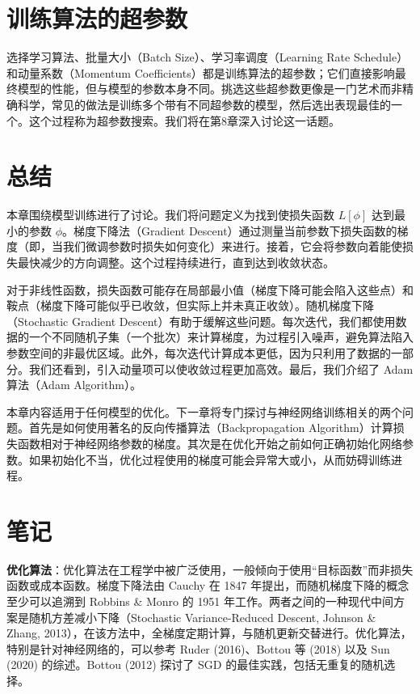 \documentclass[lang=cn,newtx,10pt,scheme=chinese]{elegantbook}
\begin{document}
\section{训练算法的超参数}
选择学习算法、批量大小（Batch Size）、学习率调度（Learning Rate Schedule）和动量系数（Momentum Coefficients）都是训练算法的超参数；它们直接影响最终模型的性能，但与模型的参数本身不同。挑选这些超参数更像是一门艺术而非精确科学，常见的做法是训练多个带有不同超参数的模型，然后选出表现最佳的一个。这个过程称为超参数搜索。我们将在第8章深入讨论这一话题。

\section{总结}
本章围绕模型训练进行了讨论。我们将问题定义为找到使损失函数 \(L[\phi]\) 达到最小的参数 \(\phi\)。梯度下降法（Gradient Descent）通过测量当前参数下损失函数的梯度（即，当我们微调参数时损失如何变化）来进行。接着，它会将参数向着能使损失最快减少的方向调整。这个过程持续进行，直到达到收敛状态。

对于非线性函数，损失函数可能存在局部最小值（梯度下降可能会陷入这些点）和鞍点（梯度下降可能似乎已收敛，但实际上并未真正收敛）。随机梯度下降（Stochastic Gradient Descent）有助于缓解这些问题。每次迭代，我们都使用数据的一个不同随机子集（一个批次）来计算梯度，为过程引入噪声，避免算法陷入参数空间的非最优区域。此外，每次迭代计算成本更低，因为只利用了数据的一部分。我们还看到，引入动量项可以使收敛过程更加高效。最后，我们介绍了 Adam 算法（Adam Algorithm）。

本章内容适用于任何模型的优化。下一章将专门探讨与神经网络训练相关的两个问题。首先是如何使用著名的反向传播算法（Backpropagation Algorithm）计算损失函数相对于神经网络参数的梯度。其次是在优化开始之前如何正确初始化网络参数。如果初始化不当，优化过程使用的梯度可能会异常大或小，从而妨碍训练进程。

\section{笔记}
\textbf{优化算法}：优化算法在工程学中被广泛使用，一般倾向于使用“目标函数”而非损失函数或成本函数。梯度下降法由 Cauchy 在 1847 年提出，而随机梯度下降的概念至少可以追溯到 Robbins \& Monro 的 1951 年工作。两者之间的一种现代中间方案是随机方差减小下降（Stochastic Variance-Reduced Descent, Johnson \& Zhang, 2013），在该方法中，全梯度定期计算，与随机更新交替进行。优化算法，特别是针对神经网络的，可以参考 Ruder (2016)、Bottou 等 (2018) 以及 Sun (2020) 的综述。Bottou (2012) 探讨了 SGD 的最佳实践，包括无重复的随机选择。
\end{document}
